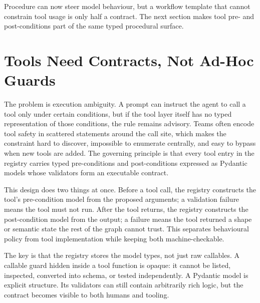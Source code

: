 Procedure can now steer model behaviour, but a workflow template that cannot constrain tool usage is only half a contract. The next section makes tool pre- and post-conditions part of the same typed procedural surface.

\section{Tools Need Contracts, Not Ad-Hoc Guards}
\label{sec:tools-need-contracts}

The problem is execution ambiguity. A prompt can instruct the agent to call a tool only under certain conditions, but if the tool layer itself has no typed representation of those conditions, the rule remains advisory. Teams often encode tool safety in scattered  statements around the call site, which makes the constraint hard to discover, impossible to enumerate centrally, and easy to bypass when new tools are added. The governing principle is that every tool entry in the registry carries typed pre-conditions and post-conditions expressed as Pydantic models whose validators form an executable contract.

This design does two things at once. Before a tool call, the registry constructs the tool's pre-condition model from the proposed arguments; a validation failure means the tool must not run. After the tool returns, the registry constructs the post-condition model from the output; a failure means the tool returned a shape or semantic state the rest of the graph cannot trust. This separates behavioural policy from tool implementation while keeping both machine-checkable.

The key is that the registry stores the model types, not just raw callables. A callable guard hidden inside a tool function is opaque: it cannot be listed, inspected, converted into schema, or tested independently. A Pydantic model is explicit structure. Its validators can still contain arbitrarily rich logic, but the contract becomes visible to both humans and tooling.


